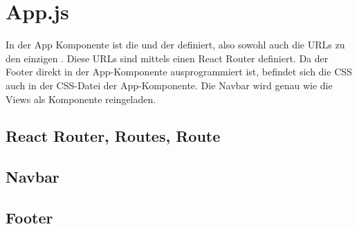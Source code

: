 \section{App.js}
\label{appDatei}

In der App Komponente ist die  und der  definiert, 
also sowohl auch die URLs zu den einzigen . Diese URLs sind mittels einen React 
Router definiert. Da der Footer direkt in der App-Komponente ausprogrammiert ist, 
befindet sich die CSS auch in der CSS-Datei der App-Komponente. Die Navbar wird genau wie die Views 
als Komponente reingeladen.

\subsection{React Router, Routes, Route}

\subsection{Navbar}
\label{nav}
\subsection{Footer}
\label{footer}
